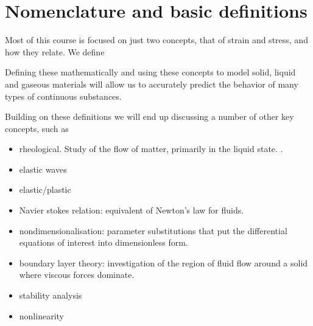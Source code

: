 
\section{Nomenclature and basic definitions}

Most of this course is focused on just two concepts, that of strain and stress, and how they relate.  We define





Defining these mathematically and using these concepts to model solid, liquid and gaseous materials will allow us to accurately predict the behavior of many types of continuous substances.

Building on these definitions we will end up discussing a number of other key concepts, such as

\begin{itemize}
\item rheological.  Study of the flow of matter, primarily in the liquid state.  \citep{wiki:rheology}.
\item elastic waves
\item elastic/plastic
\item Navier stokes relation: equivalent of Newton's law for fluids.
\item nondimensionalisation: parameter substitutions that put the differential equations of interest into dimensionless form.
\item boundary layer theory: investigation of the region of fluid flow around a solid where viscous forces dominate.
\item stability analysis
\item nonlinearity 
\end{itemize}

